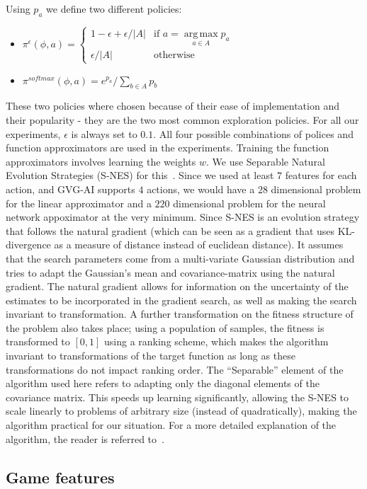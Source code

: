 \documentclass[conference]{IEEEtran}
\DeclareMathOperator*{\argmax}{arg\,max}
\newcommand{\twopartdefo}[3]
{
  \left\{
    \begin{array}{ll}
      #1 & \mbox{if } #2 \\
      #3 & \mbox{otherwise}
    \end{array}
  \right.
}
\begin{document}
Using $p_a$ we define two different policies:

\begin{itemize}
\item $\pi^\epsilon(\phi,a) = \twopartdefo{ 1-\epsilon + \epsilon/|A| }{ a = \argmax\limits_{a \in A}  p_a}{\epsilon/|A|}$
\item $\pi^{softmax}(\phi,a) = e^{p_a}/ \sum\limits_{b \in A} p_b $
\end{itemize}

These two policies where chosen because of their ease of implementation and their popularity - they are the two most common exploration policies. For all our experiments, $\epsilon$ is always set to $0.1$. All four possible combinations of polices and function approximators are used in the experiments. Training the function approximators involves learning the weights $w$. We use Separable Natural Evolution Strategies (S-NES) for this~\cite{schaul2011high}. Since we used at least $7$ features for each action, and GVG-AI supports $4$ actions, we would have a $28$ dimensional problem for the linear approximator and a $220$ dimensional problem for the neural network appoximator at the very minimum. Since S-NES is an evolution strategy that follows the natural gradient (which can be seen as a gradient that uses KL-divergence as a measure of distance instead of euclidean distance). It assumes that the search parameters come from a multi-variate Gaussian distribution and tries to adapt the Gaussian's mean and covariance-matrix using the natural gradient. The natural gradient allows for information on the uncertainty of the estimates to be incorporated in the gradient search, as well as making the search invariant to transformation. A further transformation on the fitness structure of the problem also takes place; using a population of samples, the fitness is transformed to $[0,1]$ using a ranking scheme, which makes the algorithm invariant to transformations of the target function as long as these transformations do not impact ranking order. The ``Separable'' element of the algorithm used here refers to adapting only the diagonal elements of the covariance matrix. This speeds up learning significantly, allowing the S-NES to scale linearly to problems of arbitrary size (instead of quadratically), making the algorithm practical for our situation. For a more detailed explanation of the algorithm, the reader is referred to~\cite{schaul2011high}. 

\subsection{Game features} \label{ssec:feat}
\end{document}
